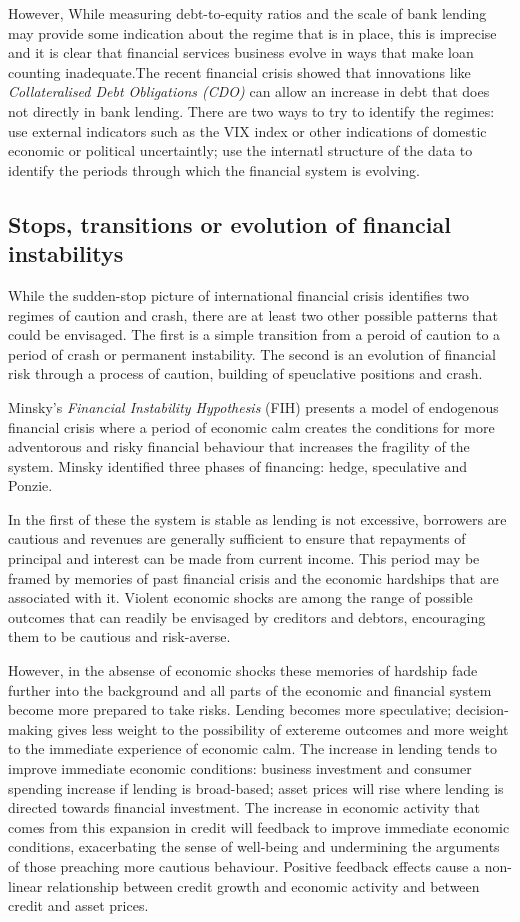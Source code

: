 \documentclass[12pt, a4paper, oneside]{article} %
\begin{document}
However, While measuring debt-to-equity ratios and the scale of bank lending may provide some indication about the regime that is in place, this is imprecise and it is clear that financial services business evolve in ways that make loan counting  inadequate.The recent financial crisis showed that innovations like \emph{Collateralised Debt Obligations (CDO)} can allow an increase in debt that does not directly in bank lending. There are two ways to try to identify the regimes: use external indicators such as the VIX index or other indications of domestic economic or political uncertaintly; use the internatl structure of the data to identify the periods through which the financial system  is evolving.  

\subsection{Stops, transitions or evolution of financial instabilitys}
While the sudden-stop picture of international financial crisis identifies two regimes of caution and crash, there are at least two other possible patterns that could be envisaged.  The first is a simple transition from a peroid of caution to a period of crash or permanent instability.  The second is an evolution of financial risk through a process of caution, building of speuclative positions and crash. 

Minsky's \emph{Financial Instability Hypothesis} (FIH) presents a model of endogenous financial crisis where a period of economic calm creates the conditions for more adventorous and risky financial behaviour that increases the fragility of the system.  Minsky identified three phases of financing:  hedge, speculative and Ponzie.  

In the first of these the system is stable as lending is not excessive, borrowers are cautious and revenues are generally sufficient to ensure that repayments of principal and interest can be made from current income.  This period may be framed by memories of past financial crisis and the economic hardships that are associated with it.  Violent economic shocks are among the range of possible outcomes that can readily be envisaged by creditors and debtors, encouraging them to be cautious and risk-averse. 

However, in the absense of economic shocks these memories of hardship fade further into the background and all parts of the economic and financial system become more prepared to take risks.  Lending becomes more speculative; decision-making gives less weight to the possibility of extereme outcomes and more weight to the immediate experience of economic calm.  The increase in lending tends to improve immediate economic conditions:  business investment and consumer spending increase if lending is broad-based; asset prices will rise where lending is directed towards financial investment.  The increase in economic activity that comes from this expansion in credit will feedback to improve immediate economic conditions, exacerbating the sense of well-being and undermining the arguments of those preaching more cautious behaviour.  Positive feedback effects cause a non-linear relationship between credit growth and economic activity and between credit and asset prices. 
\end{document}
